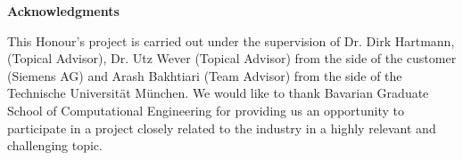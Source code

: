 \clearemptydoublepage
{}
{}	



\vspace*{2cm}

\begin{center}
{\Large \bf Acknowledgments}
\end{center}

\vspace{1cm}

This Honour's project is carried out under the supervision of Dr. Dirk Hartmann, (Topical Advisor), Dr. Utz Wever (Topical Advisor) from the side of the customer (Siemens AG) and
Arash Bakhtiari (Team Advisor) from the side of the Technische Universit{\"a}t M{\"u}nchen. We would like to thank Bavarian Graduate School of Computational Engineering for providing us an opportunity to participate in a project closely related to the industry in a highly relevant and challenging topic.